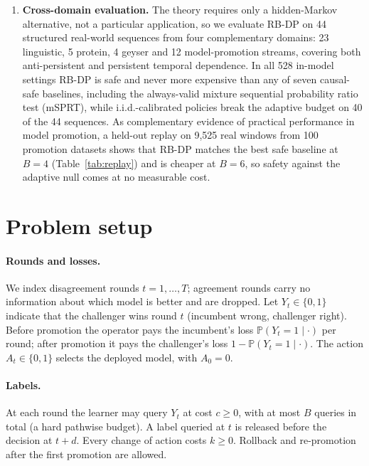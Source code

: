 \documentclass{article}
\theoremstyle{plain}
\theoremstyle{definition}
\theoremstyle{remark}
\newcommand{\PP}{\mathbb{P}}
\begin{document}
\begin{enumerate}[leftmargin=*,itemsep=1pt,topsep=2pt]
\item \textbf{Cross-domain evaluation.} The theory requires only a hidden-Markov alternative, not a particular application, so we evaluate RB-DP on 44 structured real-world sequences from four complementary domains: 23 linguistic, 5 protein, 4 geyser and 12 model-promotion streams, covering both anti-persistent and persistent temporal dependence. In all 528 in-model settings RB-DP is safe and never more expensive than any of seven causal-safe baselines, including the always-valid mixture sequential probability ratio test (mSPRT), while i.i.d.-calibrated policies break the adaptive budget on 40 of the 44 sequences. As complementary evidence of practical performance in model promotion, a held-out replay on 9{,}525 real windows from 100 promotion datasets shows that RB-DP matches the best safe baseline at $B=4$ (Table~\ref{tab:replay}) and is cheaper at $B=6$, so safety against the adaptive null comes at no measurable cost.
\end{enumerate}


\section{Problem setup}
\label{sec:setup}

\paragraph{Rounds and losses.} We index disagreement rounds $t=1,\dots,T$; agreement rounds carry no information about which model is better and are dropped. Let $Y_t\in\{0,1\}$ indicate that the challenger wins round $t$ (incumbent wrong, challenger right). Before promotion the operator pays the incumbent's loss $\PP(Y_t=1\mid\cdot)$ per round; after promotion it pays the challenger's loss $1-\PP(Y_t=1\mid\cdot)$. The action $A_t\in\{0,1\}$ selects the deployed model, with $A_0=0$.

\paragraph{Labels.} At each round the learner may query $Y_t$ at cost $c\ge 0$, with at most $B$ queries in total (a hard pathwise budget). A label queried at $t$ is released before the decision at $t+d$. Every change of action costs $k\ge 0$. Rollback and re-promotion after the first promotion are allowed.
\end{document}
